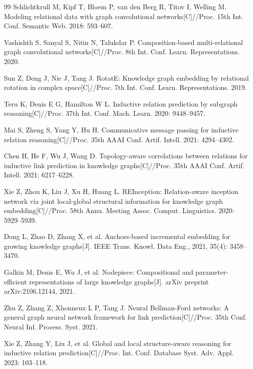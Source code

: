 \documentclass[preprint,12pt]{elsarticle}
\begin{document}
\renewcommand{\refname}{References}
\begin{thebibliography}{99}
Schlichtkrull M, Kipf T, Bloem P, van den Berg R, Titov I, Welling M.
Modeling relational data with graph convolutional networks[C]//Proc. 15th Int. Conf. Semantic Web.
2018: 593--607.

Vashishth S, Sanyal S, Nitin N, Talukdar P.
Composition-based multi-relational graph convolutional networks[C]//Proc. 8th Int. Conf. Learn. Representations.
2020.

Sun Z, Deng J, Nie J, Tang J.
RotatE: Knowledge graph embedding by relational rotation in complex space[C]//Proc. 7th Int. Conf. Learn. Representations.
2019.

Teru K, Denis E G, Hamilton W L.
Inductive relation prediction by subgraph reasoning[C]//Proc. 37th Int. Conf. Mach. Learn.
2020: 9448--9457.

Mai S, Zheng S, Yang Y, Hu H.
Communicative message passing for inductive relation reasoning[C]//Proc. 35th AAAI Conf. Artif. Intell.
2021: 4294--4302.

Chen H, He F, Wu J, Wang D.
Topology-aware correlations between relations for inductive link prediction in knowledge graphs[C]//Proc. 35th AAAI Conf. Artif. Intell.
2021: 6217--6228.

Xie Z, Zhou K, Liu J, Xu H, Huang L.
REInception: Relation-aware inception network via joint local-global structural information for knowledge graph embedding[C]//Proc. 58th Annu. Meeting Assoc. Comput. Linguistics.
2020: 5929--5939.

Dong L, Zhao D, Zhang X, et al.
Anchors-based incremental embedding for growing knowledge graphs[J]. IEEE Trans. Knowl. Data Eng., 2021, 35(4): 3458--3470.

Galkin M, Denis E, Wu J, et al.
Nodepiece: Compositional and parameter-efficient representations of large knowledge graphs[J]. arXiv preprint arXiv:2106.12144, 2021.

Zhu Z, Zhang Z, Xhonneux L P, Tang J.
Neural Bellman-Ford networks: A general graph neural network framework for link prediction[C]//Proc. 35th Conf. Neural Inf. Process. Syst.
2021.

Xie Z, Zhang Y, Liu J, et al.
Global and local structure-aware reasoning for inductive relation prediction[C]//Proc. Int. Conf. Database Syst. Adv. Appl.
2023: 103--118.


\end{thebibliography}
\end{document}
